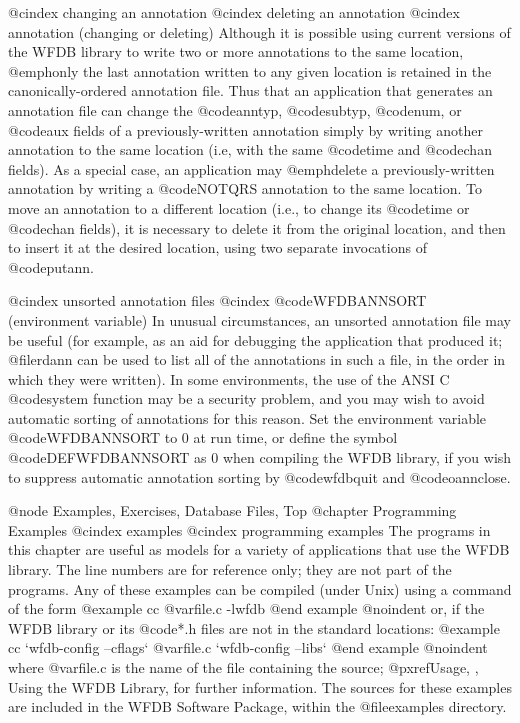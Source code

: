 {{{{{{{{{{@cindex changing an annotation
@cindex deleting an annotation
@cindex annotation (changing or deleting)
Although it is possible using current versions of the WFDB library to write two
or more annotations to the same location, @emph{only the last annotation
written to any given location is retained} in the canonically-ordered
annotation file.  Thus that an application that generates an annotation file
can change the @code{anntyp}, @code{subtyp}, @code{num}, or @code{aux} fields
of a previously-written annotation simply by writing another annotation to the
same location (i.e, with the same @code{time} and @code{chan} fields).  As a
special case, an application may @emph{delete} a previously-written annotation
by writing a @code{NOTQRS} annotation to the same location.  To move an
annotation to a different location (i.e., to change its @code{time} or
@code{chan} fields), it is necessary to delete it from the original location,
and then to insert it at the desired location, using two separate invocations
of @code{putann}.

@cindex unsorted annotation files
@cindex @code{WFDBANNSORT} (environment variable)
In unusual circumstances, an unsorted annotation file may be useful (for
example, as an aid for debugging the application that produced it; @file{rdann}
can be used to list all of the annotations in such a file, in the order in
which they were written).  In some environments, the use of the ANSI C
@code{system} function may be a security problem, and you may wish to avoid
automatic sorting of annotations for this reason.  Set the environment variable
@code{WFDBANNSORT} to 0 at run time, or define the symbol @code{DEFWFDBANNSORT}
as 0 when compiling the WFDB library, if you wish to suppress automatic
annotation sorting by @code{wfdbquit} and @code{oannclose}.

@node Examples, Exercises, Database Files, Top
@chapter Programming Examples
@cindex examples
@cindex programming examples
The programs in this chapter are useful as models for a variety of
applications that use the WFDB library.  The line numbers are for
reference only; they are not part of the programs.  Any of these
examples can be compiled (under Unix) using a command of the form
@example
cc @var{file.c} -lwfdb
@end example
@noindent
or, if the WFDB library or its @code{*.h} files are not in the standard
locations:
@example
cc `wfdb-config --cflags` @var{file.c} `wfdb-config --libs`
@end example
@noindent
where @var{file.c} is the name of the file containing the source;
@pxref{Usage, , Using the WFDB Library}, for further information.
The sources for these examples are included in the WFDB Software Package,
within the @file{examples} directory.

}}}}}}}}}}
